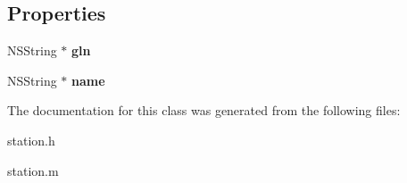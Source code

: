 \subsection*{Properties}
\begin{DoxyCompactItemize}
\item 
\hypertarget{interfacestation_af00cea32190b75574e8665209d6d60d1}{}N\+S\+String $\ast$ {\bfseries gln}\label{interfacestation_af00cea32190b75574e8665209d6d60d1}

\item 
\hypertarget{interfacestation_a1a5763aad03cd862ef0b363af5c7f16a}{}N\+S\+String $\ast$ {\bfseries name}\label{interfacestation_a1a5763aad03cd862ef0b363af5c7f16a}

\end{DoxyCompactItemize}


The documentation for this class was generated from the following files\+:\begin{DoxyCompactItemize}
\item 
station.\+h\item 
station.\+m\end{DoxyCompactItemize}
